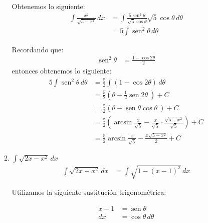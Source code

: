 \documentclass[a4paper,10pt]{article}
\newcommand{\dis}{\displaystyle}
\def\sin{\operatorname{sen}}
\begin{document}
\begin{enumerate}
\begin{enumerate}[label=\emph{\alph*)}]
\begin{minipage}{.3\textwidth}
\end{minipage}


Obtenemos lo siguiente:
\begin{align*}
 \dis \int \frac{x^2}{\sqrt{5-x^2}}\, dx  &=  \dis \int \frac{5\sin^2 \theta}{\sqrt{5}\cos \theta}\sqrt{5}\cos \theta  \, d\theta\\
 										  &=  \dis 5 \int \sin^2 \theta  \, d\theta
\end{align*}
\dotfill [1 punto]

Recordando que:
\begin{align*}
 \dis \sin^2 \theta  &= \frac{1-\cos 2\theta}{2}
\end{align*}
entonces obtenemos lo siguiente:
\begin{align*}
 \dis 5 \int \sin^2 \theta  \, d\theta  &= \frac{5}{2} \dis \int (1-\cos 2\theta)  \, d\theta\\
 									    &= \frac{5}{2} \dis \left( \theta -\frac{1}{2}\sin 2\theta  \ \right)+C \\
                                        &= \frac{5}{2} \dis \left( \theta - \sin\theta \cos \theta  \ \right)+C \\
                                        &= \frac{5}{2} \dis \left( \arcsin \frac{x}{\sqrt{5}} - \frac{x}{\sqrt{5}} \cdot \frac{\sqrt{5-x^2}}{\sqrt{5}} \right)+C \\
                                        &= \frac{5}{2} \arcsin \frac{x}{\sqrt{5}} - \frac{x\sqrt{5-x^2}}{2} +C
\end{align*}
\dotfill [1 punto]


\newpage
\item $\dis \int \sqrt{2x-x^2}\, dx$\\

\begin{align*}
 \dis \int \sqrt{2x-x^2}\, dx  &=    \dis \int \sqrt{1 - (x-1)^2}\, dx
\end{align*}

Utilizamos la siguiente sustitución trigonométrica:\\

\begin{minipage}{.3\textwidth}
\raggedright
\begin{align*}
x -1  &= \sin \theta      \\
dx &= \cos \theta  \, d\theta
\end{align*}
\end{minipage}%
\begin{minipage}{.3\textwidth}
\raggedleft
{}
\end{minipage}
\end{enumerate}
\end{enumerate}
\end{document}
